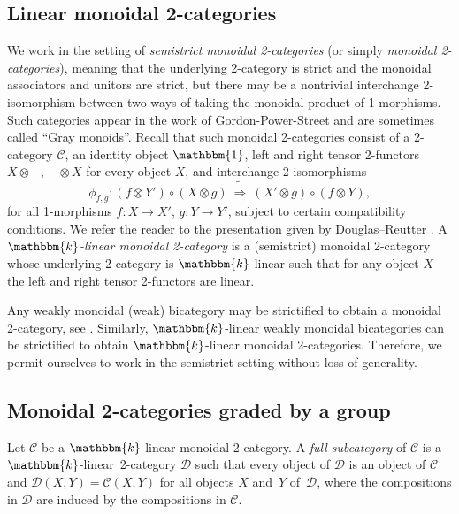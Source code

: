 \documentclass[a4paper, oneside]{amsart}
\numberwithin{equation}{subsection}
\theoremstyle{referencedlemma}
\theoremstyle{plain} %
\theoremstyle{remark}
\begin{document}
\subsection{Linear monoidal 2-categories}
We work in the setting of \emph{semistrict monoidal 2-categories} (or simply \emph{monoidal \mbox{2-cate}gories}), meaning that the underlying 2-category is strict and the monoidal associators and unitors are strict, but there may be a nontrivial interchange 2-isomorphism between two ways of taking the monoidal product of 1-morphisms. Such categories appear in the work of Gordon-Power-Street \cite{gordon_coherence_1995} and are sometimes called ``Gray monoids''.  Recall that such monoidal 2-categories consist of a 2-category $\mathcal{C}$, an identity object $\mathbbm{1}$, left and right tensor 2-functors $X\otimes -$, $- \otimes X$ for every object $X$, and interchange 2-isomorphisms
$$
\phi_{f,g} \colon (f\otimes Y') \circ (X \otimes g) \ \tilde{\Rightarrow} \ (X'\otimes g) \circ (f\otimes Y),
$$
for all 1-morphisms $f\colon X \to X'$, $g\colon Y \to Y'$, subject to certain compatibility conditions.  We refer the reader to the presentation given by Douglas--Reutter \cite{douglas_fusion_2018}.  A \emph{$\mathbbm{k}$-linear monoidal 2-category} is a (semistrict) monoidal 2-category whose underlying 2-category is $\mathbbm{k}$-linear such that for any object $X$ the left and right tensor 2-functors are linear.

Any weakly monoidal (weak) bicategory may be strictified to obtain a monoidal 2-category, see \cite{gordon_coherence_1995}. Similarly, $\mathbbm{k}$-linear weakly monoidal bicategories can be strictified to obtain $\mathbbm{k}$-linear monoidal \mbox{2-cate}\-gories. Therefore, we permit ourselves to work in the semistrict setting without loss of generality. 

\subsection{Monoidal 2-categories graded by a group}\label{Section_group-graded}
Let $\mathcal{C}$ be a $\mathbbm{k}$-linear monoidal 2-category. A \emph{full subcategory} of $\mathcal{C}$ is a $\mathbbm{k}$-linear~2-category $\mathcal{D}$ such that every object of $\mathcal{D}$ is an object of $\mathcal{C}$ and $\mathcal{D}(X,Y) = \mathcal{C}(X,Y)$ for all objects $X$ and~$Y$ of~$\mathcal{D}$, where the compositions in $\mathcal{D}$ are induced by the compositions in $\mathcal{C}$.
\end{document}
